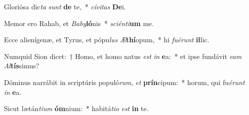 \item Gloriósa dic\textit{ta} \textit{sunt} \textbf{de} te,~* \textit{cí}\textit{vi}\textit{tas} \textbf{De}i.
\item Memor ero Rahab, et \textit{Ba}\textit{by}\textbf{ló}nis~* \textit{sci}\textit{én}\textit{ti}\textbf{um} me.
\item Ecce alienígenæ, et Tyrus, et pópu\textit{lus} \textit{Æ}\textbf{thí}opum,~* hi \textit{fu}\textit{é}\textit{runt} \textbf{il}lic.
\item Numquid Sion dicet:~† Homo, et homo natus \textit{est} \textit{in} \textbf{e}a:~* et ipse fundávit \textit{e}\textit{am} \textit{Al}\textbf{tís}simus?
\item Dóminus narrábit in scriptúris populó\textit{rum}, \textit{et} \textbf{prín}cipum:~* horum, qui fu\textit{é}\textit{runt} \textit{in} \textbf{e}a.
\item Sicut lætán\textit{ti}\textit{um} \textbf{óm}nium:~* habitá\textit{ti}\textit{o} \textit{est} \textbf{in} te.
